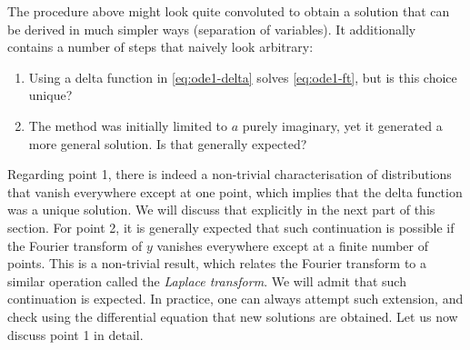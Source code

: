 The procedure above might look quite convoluted to obtain a solution that can be derived
in much simpler ways (\eg separation of variables). It additionally contains a number of
steps that naively look arbitrary:
\begin{enumerate}
  \item Using a delta function in \cref{eq:ode1-delta} solves \cref{eq:ode1-ft}, but is this
        choice unique?
  \item The method was initially limited to $a$ purely imaginary, yet it generated a more general
        solution. Is that generally expected?
\end{enumerate}
Regarding point 1, there is indeed a non-trivial characterisation of distributions that
vanish everywhere except at one point, which implies that the delta function was a unique
solution. We will discuss that explicitly in the next part of this section. For point 2,
it is generally expected that such continuation is possible if the Fourier transform of
$y$ vanishes everywhere except at a finite number of points. This is a non-trivial result,
which relates the Fourier transform to a similar operation called the \emph{Laplace
  transform}. We will admit that such continuation is expected. In practice, one can always
attempt such extension, and check using the differential equation that new solutions are
obtained. Let us now discuss point 1 in detail.
